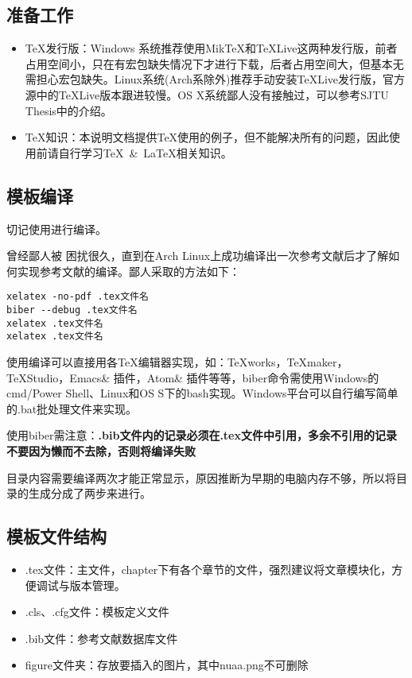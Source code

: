 \subsection{准备工作}
\begin{itemize}
  \item \TeX 发行版：Windows 系统推荐使用MikTeX和\TeX Live这两种发行版，前者占用空间小，只在有宏包缺失情况下才进行下载，后者占用空间大，但基本无需担心宏包缺失。Linux系统(Arch系除外)推荐手动安装\TeX Live发行版，官方源中的TeXLive版本跟进较慢。OS X系统鄙人没有接触过，可以参考SJTU Thesis中的介绍。
  \item \TeX 知识：本说明文档提供\TeX 使用的例子，但不能解决所有的问题，因此使用前请自行学习\TeX~\&~\LaTeX 相关知识。
\end{itemize}

\subsection{模板编译}

切记使用\XeLaTeX 进行编译。

曾经鄙人被 困扰很久，直到在Arch Linux上成功编译出一次参考文献后才了解如何实现参考文献的编译。鄙人采取的方法如下：
\begin{lstlisting}[basicstyle=\small\ttfamily, caption=手动逐次编译, numbers=none]
xelatex -no-pdf .tex文件名
biber --debug .tex文件名
xelatex .tex文件名
xelatex .tex文件名
\end{lstlisting}

使用\XeLaTeX 编译可以直接用各\TeX 编辑器实现，如：TeXworks，TeXmaker，TeXStudio，Emacs\& 插件，Atom\& 插件等等，biber命令需使用Windows的cmd/Power Shell、Linux和OS S下的bash实现。Windows平台可以自行编写简单的.bat批处理文件来实现。

使用biber需注意：\textbf{.bib文件内的记录必须在.tex文件中引用，多余不引用的记录不要因为懒而不去除，否则将编译失败}

目录内容需要编译两次才能正常显示，原因推断为早期的电脑内存不够，所以将目录的生成分成了两步来进行。

\subsection{模板文件结构}
\begin{itemize}[noitemsep,topsep=0pt,parsep=0pt,partopsep=0pt]
  \item .tex文件：主文件，chapter下有各个章节的文件，强烈建议将文章模块化，方便调试与版本管理。
  \item .cls、.cfg文件：模板定义文件
  \item .bib文件：参考文献数据库文件
  \item figure文件夹：存放要插入的图片，其中nuaa.png不可删除
\end{itemize}
